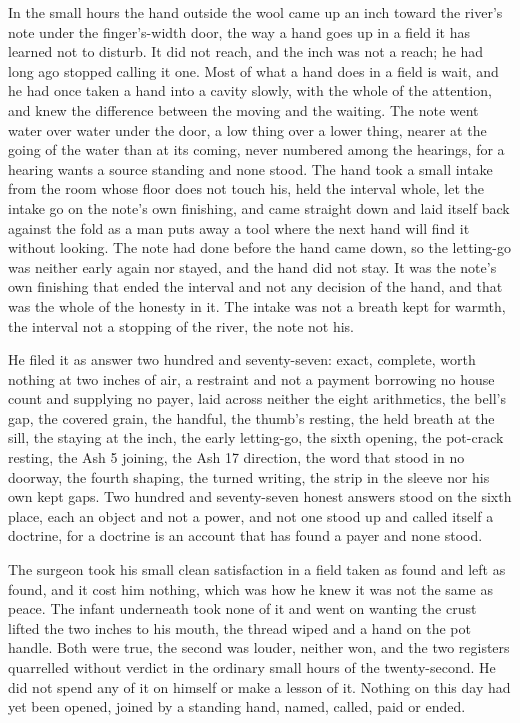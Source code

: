 In the small hours the hand outside the wool came up an inch toward the river's note under the finger's-width door, the way a hand goes up in a field it has learned not to disturb. It did not reach, and the inch was not a reach; he had long ago stopped calling it one. Most of what a hand does in a field is wait, and he had once taken a hand into a cavity slowly, with the whole of the attention, and knew the difference between the moving and the waiting. The note went water over water under the door, a low thing over a lower thing, nearer at the going of the water than at its coming, never numbered among the hearings, for a hearing wants a source standing and none stood. The hand took a small intake from the room whose floor does not touch his, held the interval whole, let the intake go on the note's own finishing, and came straight down and laid itself back against the fold as a man puts away a tool where the next hand will find it without looking. The note had done before the hand came down, so the letting-go was neither early again nor stayed, and the hand did not stay. It was the note's own finishing that ended the interval and not any decision of the hand, and that was the whole of the honesty in it. The intake was not a breath kept for warmth, the interval not a stopping of the river, the note not his.

He filed it as answer two hundred and seventy-seven: exact, complete, worth nothing at two inches of air, a restraint and not a payment borrowing no house count and supplying no payer, laid across neither the eight arithmetics, the bell's gap, the covered grain, the handful, the thumb's resting, the held breath at the sill, the staying at the inch, the early letting-go, the sixth opening, the pot-crack resting, the Ash 5 joining, the Ash 17 direction, the word that stood in no doorway, the fourth shaping, the turned writing, the strip in the sleeve nor his own kept gaps. Two hundred and seventy-seven honest answers stood on the sixth place, each an object and not a power, and not one stood up and called itself a doctrine, for a doctrine is an account that has found a payer and none stood.

The surgeon took his small clean satisfaction in a field taken as found and left as found, and it cost him nothing, which was how he knew it was not the same as peace. The infant underneath took none of it and went on wanting the crust lifted the two inches to his mouth, the thread wiped and a hand on the pot handle. Both were true, the second was louder, neither won, and the two registers quarrelled without verdict in the ordinary small hours of the twenty-second. He did not spend any of it on himself or make a lesson of it. Nothing on this day had yet been opened, joined by a standing hand, named, called, paid or ended.

